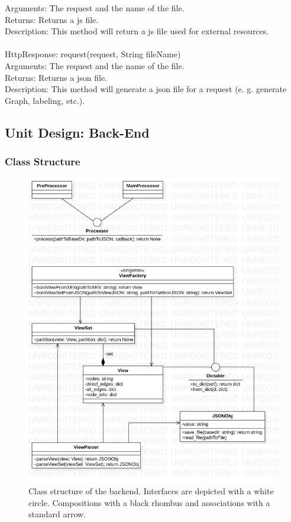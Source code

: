 \documentclass[12pt]{extarticle}
\begin{document}
    Arguments: The request and the name of the file. \\
	Returns: Returns a js file. \\
	Description: This method will return a js file used for external resources. \\ \\
	HttpResponse: request(request, String fileName) \\
    Arguments: The request and the name of the file. \\
	Returns: Returns a json file. \\
	Description: This method will generate a json file for a request (e. g. generate Graph, labeling, etc.). \\

\subsection{Unit Design: Back-End}

\subsubsection{Class Structure}

\begin{figure}[H]
    \centering
    \includegraphics[width=\textwidth]{bclasses.png}
    \caption{Class structure of the backend. Interfaces are depicted with a white circle. Compositions with a black rhombus
    and associations with a standard arrow.}
    \label{fig:bclasses}
\end{figure}
\end{document}
